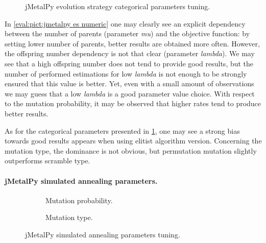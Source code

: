 \begin{figure}[h!]
	\centering
	\vspace{-20pt}
	
	\caption{jMetalPy evolution strategy categorical parameters tuning.}
	\label{eval:pict:jmetalpy es categoric}
	\vspace{-20pt}
\end{figure}

In \cref{eval:pict:jmetalpy es numeric} one may clearly see an explicit dependency between the number of parents (parameter \emph{mu}) and the objective function: by setting lower number of parents, better results are obtained more often. However, the offspring number dependency is not that clear (parameter \emph{lambda}). We may see that a high offspring number does not tend to provide good results, but the number of performed estimations for low \emph{lambda} is not enough to be strongly ensured that this value is better. Yet, even with a small amount of observations we may guess that a low \emph{lambda} is a good parameter value choice. With respect to the mutation probability, it may be observed that higher rates tend to produce better results. 

As for the categorical parameters presented in \cref{eval:pict:jmetalpy es categoric}, one may see a strong bias towards good results appears when using elitist algorithm version. Concerning the mutation type, the dominance is not obvious, but permutation mutation slightly outperforms scramble type.


\paragraph{jMetalPy simulated annealing parameters.}
\begin{figure}[h]
	\centering
	\begin{subfigure}{0.35\textwidth}
		\vspace{-10pt}
		
		\caption{Mutation probability.}
		\label{eval:pict:jmetalpy sa numeric}
	\end{subfigure}
	\hfil 
	\begin{subfigure}{0.4\textwidth}
		
		\vspace{-5pt}
		\caption{Mutation type.}
		\label{eval:pict:jmetalpy sa categoric}
	\end{subfigure}
	\caption{jMetalPy simulated annealing parameters tuning.}
\end{figure}

